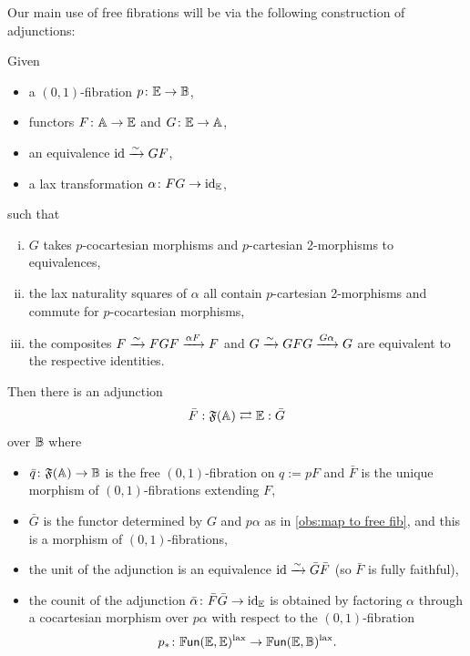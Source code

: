 \documentclass[a4paper,11pt]{article}
\newcommand{\FFr}{\mathfrak{F}}
\begin{document}
Our main use of free \itcatl{} fibrations will be via the following
construction of adjunctions:
\begin{propn}\label{propn:extend adjn}
  Given
  \begin{itemize}
  \item a $(0,1)$-fibration $p \colon \tE \to \tB$,
  \item functors $F \colon \tA \to \tE$ and $G \colon \tE \to \tA$,
  \item an equivalence $\id \isoto GF$,
  \item a lax transformation $\alpha \colon FG \to \id_{\tE}$,
  \end{itemize}
  such that
  \begin{enumerate}[(i)]
  \item $G$ takes $p$-cocartesian morphisms and $p$-cartesian
    2-morphisms to equivalences,
  \item the lax naturality squares of $\alpha$ all contain
    $p$-cartesian 2-morphisms and commute for $p$-cocartesian
    morphisms,
  \item the composites $F \isoto FGF \xto{\alpha F} F$ and
    $G \isoto GFG \xto{G \alpha} G$ are equivalent to the respective
    identities.
  \end{enumerate}
  Then there is an adjunction
  \[ \bar{F} : \FFr(\tA) \rightleftarrows \tE : \bar{G}\]
  over $\mathbb{B}$ where
  \begin{itemize}
  \item $\bar{q} \colon \FFr(\tA) \to \tB$ is the free $(0,1)$-fibration on $q := pF$
    and $\bar{F}$ is the unique morphism of $(0,1)$-fibrations
    extending $F$,
  \item $\bar{G}$ is the functor determined by $G$ and $p\alpha$ as in
    \cref{obs:map to free fib}, and this is a morphism of $(0,1)$-fibrations,
  \item the unit of the adjunction is an equivalence $\id \isoto
    \bar{G}\bar{F}$ (so $\bar{F}$ is fully faithful),
  \item the counit of the adjunction $\bar{\alpha} \colon \bar{F}\bar{G} \to \id_{\tE}$ is
    obtained by factoring $\alpha$ through a cocartesian morphism over
    $p\alpha$ with respect to the $(0,1)$-fibration
    \[ p_{*} \colon \FUN(\tE,\tE)^{\lax} \to \FUN(\tE, \tB)^{\lax}.\]
  \end{itemize}
\end{propn}
\end{document}
